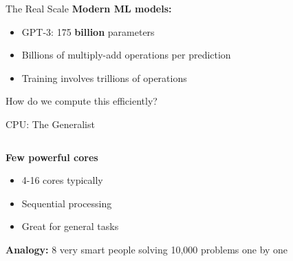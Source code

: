\documentclass[10pt]{beamer}
\begin{document}
\begin{frame}{The Real Scale}
  \textbf{Modern ML models:}
  
  \vspace{1em}
  \begin{itemize}
    \item GPT-3: 175 \textbf{billion} parameters
    \item Billions of multiply-add operations per prediction
    \item Training involves trillions of operations
  \end{itemize}
  
  \vspace{2em}
  \centering
  \Large How do we compute this efficiently?
\end{frame}

\begin{frame}{CPU: The Generalist}
  \begin{columns}[T]
    \begin{column}{0.5\textwidth}
      \textbf{Few powerful cores}
      \begin{itemize}
        \item 4-16 cores typically
        \item Sequential processing
        \item Great for general tasks
      \end{itemize}
      
      \vspace{1em}
      \textbf{Analogy:} 8 very smart people solving 10,000 problems one by one
    \end{column}
    \begin{column}{0.5\textwidth}
    \end{column}
  \end{columns}
\end{frame}
\end{document}
